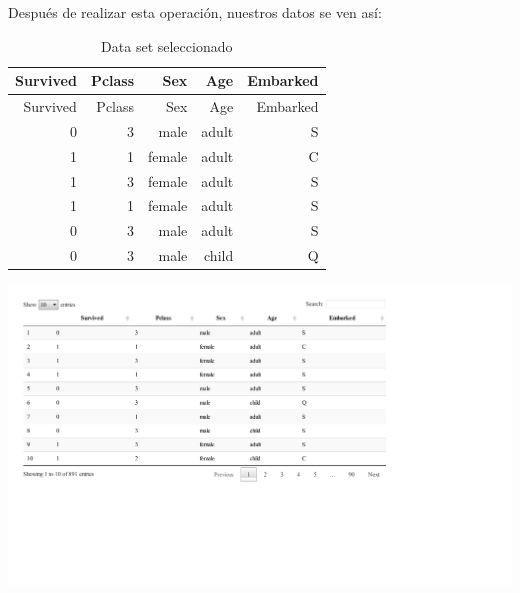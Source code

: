 \documentclass[]{article}
\newenvironment{Shaded}{\begin{snugshade}}{\end{snugshade}}
\newcommand{\KeywordTok}[1]{\textcolor[rgb]{0.13,0.29,0.53}{\textbf{#1}}}
\newcommand{\DecValTok}[1]{\textcolor[rgb]{0.00,0.00,0.81}{#1}}
\newcommand{\StringTok}[1]{\textcolor[rgb]{0.31,0.60,0.02}{#1}}
\newcommand{\OperatorTok}[1]{\textcolor[rgb]{0.81,0.36,0.00}{\textbf{#1}}}
\newcommand{\NormalTok}[1]{#1}
\begin{document}
\begin{Shaded}
\end{Shaded}

Después de realizar esta operación, nuestros datos se ven así:

\begin{longtable}[]{@{}rrrrr@{}}
\caption{Data set seleccionado}\tabularnewline
\toprule
Survived & Pclass & Sex & Age & Embarked\tabularnewline
\midrule
\endfirsthead
\toprule
Survived & Pclass & Sex & Age & Embarked\tabularnewline
\midrule
\endhead
0 & 3 & male & adult & S\tabularnewline
1 & 1 & female & adult & C\tabularnewline
1 & 3 & female & adult & S\tabularnewline
1 & 1 & female & adult & S\tabularnewline
0 & 3 & male & adult & S\tabularnewline
0 & 3 & male & child & Q\tabularnewline
\bottomrule
\end{longtable}

\includegraphics{titanicDataClean_files/figure-latex/class_2-1.pdf}
\end{document}
